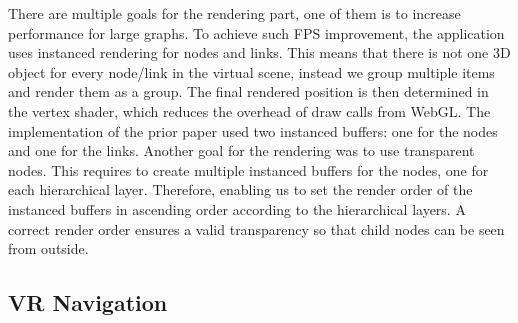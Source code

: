 There are multiple goals for the rendering part, one of them is to increase performance for large graphs. 
To achieve such FPS improvement, the application uses instanced rendering for nodes and links. This means that there is not one 3D object for every node/link in the virtual scene, instead we group multiple items and render them as a group. The final rendered position is then determined in the vertex shader, which reduces the overhead of draw calls from WebGL.
The implementation of the prior paper used two instanced buffers: one for the nodes and one for the links. 
Another goal for the rendering was to use transparent nodes. This requires to create multiple instanced buffers for the nodes, one for each hierarchical layer. 
Therefore, enabling us to set the render order of the instanced buffers in ascending order according to the hierarchical layers. A correct render order ensures  a valid transparency so that child nodes can be seen from outside.

\subsection{VR Navigation}
\label{sec:vrInteractions}


